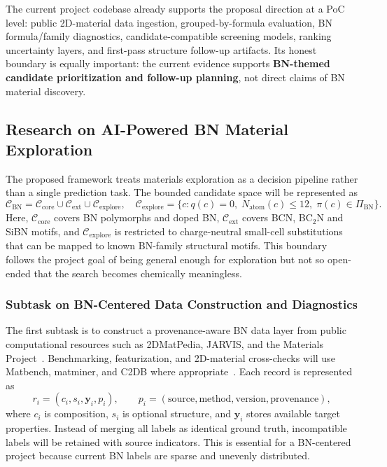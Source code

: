 \documentclass[10pt,a4paper]{article}
\begin{document}
The current project codebase already supports the proposal direction at a PoC level: public 2D-material data ingestion, grouped-by-formula evaluation, BN formula/family diagnostics, candidate-compatible screening models, ranking uncertainty layers, and first-pass structure follow-up artifacts. Its honest boundary is equally important: the current evidence supports \textbf{BN-themed candidate prioritization and follow-up planning}, not direct claims of BN material discovery.

\subsection{Research on AI-Powered BN Material Exploration}
The proposed framework treats materials exploration as a decision pipeline rather than a single prediction task. The bounded candidate space will be represented as
\[
  \mathcal{C}_{\mathrm{BN}}=
  \mathcal{C}_{\mathrm{core}}\cup\mathcal{C}_{\mathrm{ext}}\cup\mathcal{C}_{\mathrm{explore}},
  \quad
  \mathcal{C}_{\mathrm{explore}}=
  \{c:q(c)=0,\;N_{\mathrm{atom}}(c)\le 12,\;\pi(c)\in\Pi_{\mathrm{BN}}\}.
\]
Here, $\mathcal{C}_{\mathrm{core}}$ covers BN polymorphs and doped BN, $\mathcal{C}_{\mathrm{ext}}$ covers BCN, BC$_2$N and SiBN motifs, and $\mathcal{C}_{\mathrm{explore}}$ is restricted to charge-neutral small-cell substitutions that can be mapped to known BN-family structural motifs. This boundary follows the project goal of being general enough for exploration but not so open-ended that the search becomes chemically meaningless.

\subsubsection{Subtask on BN-Centered Data Construction and Diagnostics}
The first subtask is to construct a provenance-aware BN data layer from public computational resources such as 2DMatPedia, JARVIS, and the Materials Project~\cite{zhou2019_2dmatpedia,choudhary2020_jarvis,jain2013_mp}. Benchmarking, featurization, and 2D-material cross-checks will use Matbench, matminer, and C2DB where appropriate~\cite{dunn2020_matbench,ward2018_matminer,haastrup2018_c2db}. Each record is represented as
\[
  r_i=(c_i,s_i,\mathbf{y}_i,p_i),
  \qquad
  p_i=(\mathrm{source},\mathrm{method},\mathrm{version},\mathrm{provenance}),
\]
where $c_i$ is composition, $s_i$ is optional structure, and $\mathbf{y}_i$ stores available target properties. Instead of merging all labels as identical ground truth, incompatible labels will be retained with source indicators. This is essential for a BN-centered project because current BN labels are sparse and unevenly distributed.
\end{document}
